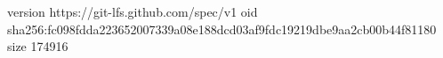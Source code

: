 version https://git-lfs.github.com/spec/v1
oid sha256:fc098fdda223652007339a08e188dcd03af9fdc19219dbe9aa2cb00b44f81180
size 174916
